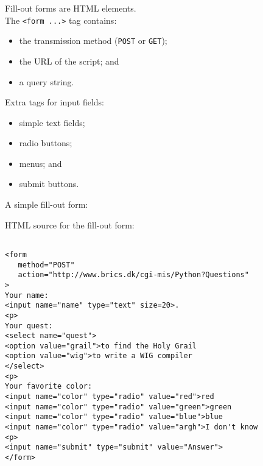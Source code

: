 \begin{slide*}
Fill-out forms are HTML elements.\\

The \verb"<form ...>" tag contains:
\begin{itemize}
\item the transmission method ({\tt POST} or {\tt GET});
\item the URL of the script; and
\item a query string.
\end{itemize}
\vspace*{2ex}

Extra tags for input fields:
\begin{itemize}
\item simple text fields;
\item radio buttons;
\item menus; and
\item submit buttons.
\end{itemize}
\vfil
\end{slide*}
 
\begin{slide*}
A simple fill-out form:\\

\begin{center}
\end{center}
\vfil
\end{slide*}
 
\begin{slide*}
HTML source for the fill-out form:

\begin{scriptsize}
\begin{verbatim}

<form 
   method="POST" 
   action="http://www.brics.dk/cgi-mis/Python?Questions"
>
Your name: 
<input name="name" type="text" size=20>.
<p>
Your quest:
<select name="quest">
<option value="grail">to find the Holy Grail
<option value="wig">to write a WIG compiler
</select>
<p>
Your favorite color:
<input name="color" type="radio" value="red">red
<input name="color" type="radio" value="green">green
<input name="color" type="radio" value="blue">blue
<input name="color" type="radio" value="argh">I don't know
<p>
<input name="submit" type="submit" value="Answer">
</form>

\end{verbatim}
\end{scriptsize}
\vfil
\end{slide*}

